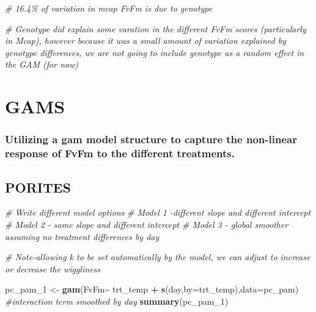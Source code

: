 \documentclass[
]{article}
\newenvironment{Shaded}{\begin{snugshade}}{\end{snugshade}}
\newcommand{\AttributeTok}[1]{\textcolor[rgb]{0.13,0.29,0.53}{#1}}
\newcommand{\CommentTok}[1]{\textcolor[rgb]{0.56,0.35,0.01}{\textit{#1}}}
\newcommand{\FunctionTok}[1]{\textcolor[rgb]{0.13,0.29,0.53}{\textbf{#1}}}
\newcommand{\NormalTok}[1]{#1}
\newcommand{\OtherTok}[1]{\textcolor[rgb]{0.56,0.35,0.01}{#1}}
\newcommand{\SpecialCharTok}[1]{\textcolor[rgb]{0.81,0.36,0.00}{\textbf{#1}}}
\begin{document}
\begin{Shaded}
\begin{Highlighting}[]
  \CommentTok{\# 16.4\% of variation in mcap FvFm is due to genotype}

\CommentTok{\# Genotype did explain some varation in the different FvFm scores (particularly in Mcap), however because it was a small amount of variation explained by genotype differences, we are not going to include genotype as a random effect in the GAM (for now)}
\end{Highlighting}
\end{Shaded}

\hypertarget{gams}{%
\section{GAMS}\label{gams}}

\hypertarget{utilizing-a-gam-model-structure-to-capture-the-non-linear-response-of-fvfm-to-the-different-treatments.}{%
\subsubsection{Utilizing a gam model structure to capture the non-linear
response of FvFm to the different
treatments.}\label{utilizing-a-gam-model-structure-to-capture-the-non-linear-response-of-fvfm-to-the-different-treatments.}}

\hypertarget{porites}{%
\subsection{PORITES}\label{porites}}

\begin{Shaded}
\begin{Highlighting}[]
\CommentTok{\# Write different model options}
  \CommentTok{\# Model 1 {-}different slope and different intercept}
  \CommentTok{\# Model 2 {-} same slope and different intercept}
  \CommentTok{\# Model 3 {-} global smoother assuming no treatment differences by day}

\CommentTok{\# Note{-}allowing \textquotesingle{}k\textquotesingle{} to be set automatically by the model, we can adjust to increase or decrease the \textquotesingle{}wiggliness\textquotesingle{}}
  
\NormalTok{pc\_pam\_1 }\OtherTok{\textless{}{-}} \FunctionTok{gam}\NormalTok{(FvFm}\SpecialCharTok{\textasciitilde{}}\NormalTok{ trt\_temp }\SpecialCharTok{+} \FunctionTok{s}\NormalTok{(day,}\AttributeTok{by=}\NormalTok{trt\_temp),}\AttributeTok{data=}\NormalTok{pc\_pam) }\CommentTok{\#interaction term smoothed by day}
\FunctionTok{summary}\NormalTok{(pc\_pam\_1)}
\end{Highlighting}
\end{Shaded}
\end{document}
